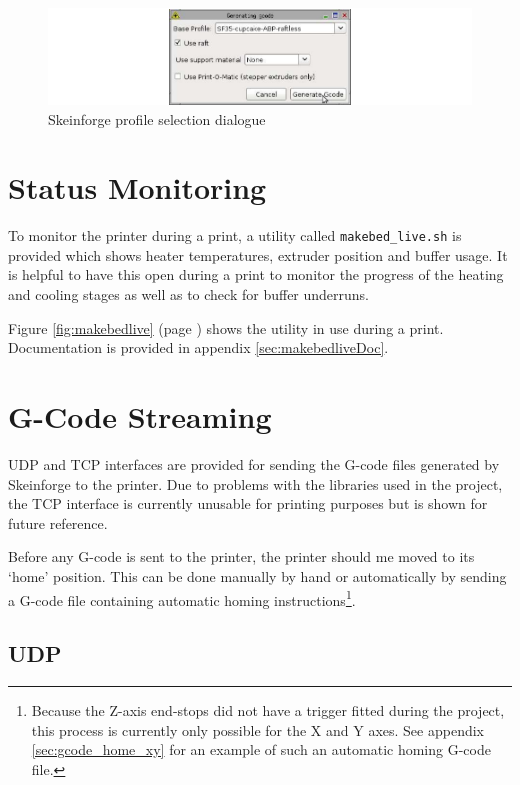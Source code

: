 		\begin{figure}
			\includegraphics[width=1\textwidth]{diagrams/skeinforge.pdf}
			\caption{Skeinforge profile selection dialogue}
			\label{fig:skeinforge}
		\end{figure}
	
	\section{Status Monitoring}
		
		To monitor the printer during a print, a utility called
		\verb|makebed_live.sh| is provided which shows heater temperatures, extruder
		position and buffer usage. It is helpful to have this open during a print to
		monitor the progress of the heating and cooling stages as well as to check
		for buffer underruns.
		
		Figure \ref{fig:makebedlive} (page \pageref{fig:makebedlive}) shows the
		utility in use during a print. Documentation is provided in appendix
		\ref{sec:makebedliveDoc}.
		
	\section{G-Code Streaming}
		
		UDP and TCP interfaces are provided for sending the G-code files generated
		by Skeinforge to the printer. Due to problems with the libraries used in the
		project, the TCP interface is currently unusable for printing purposes but
		is shown for future reference.
		
		
		Before any G-code is sent to the printer, the printer should me moved to its
		`home' position. This can be done manually by hand or automatically by
		sending a G-code file containing automatic homing
		instructions\footnote{Because the Z-axis end-stops did not have a trigger
		fitted during the project, this process is currently only possible for the X
		and Y axes. See appendix \ref{sec:gcode_home_xy} for an example of such an
		automatic homing G-code file.}.
			
		\subsection{UDP}
			
